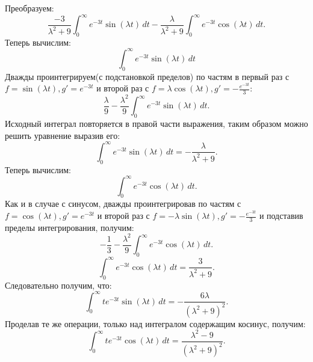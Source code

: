 \documentclass[11pt]{article}
\begin{document}
	\newline
	{\hspace{-0.6cm} Преобразуем:}
	\newline
	\[\frac{-3}{\lambda^2 + 9}\int_{0}^{\infty}e^{-3t}\sin(\lambda t)\,dt - \frac{\lambda}{\lambda^2 + 9}\int_{0}^{\infty}e^{-3t}\cos(\lambda t)\,dt.\]
	\newline
	{\hspace{-0.6cm} Теперь вычислим:}
	\[\int_{0}^{\infty}e^{-3t}\sin(\lambda t)\,dt\]
	\newline
	{\hspace{-0.6cm} Дважды проинтегрируем(с подстановкой пределов) по частям в первый раз с $f = \sin(\lambda t), g' = e^{-3t}$ и второй раз с $f = \lambda \cos(\lambda t), g' = -\frac{e^{-3t}}{3}$:}
	\newline
	\[ \frac{\lambda }{9} - \frac{\lambda^2}{9}\int_{0}^{\infty}e^{-3t}\sin(\lambda t)\,dt.\]
	\newpage
	{\vspace*{-2cm}\hspace{-0.6cm} Исходный интеграл повторяется в правой части выражения, таким образом можно решить уравнение выразив его: }
	\newline
	\[\int_{0}^{\infty}e^{-3t}\sin(\lambda t)\,dt = -\frac{\lambda}{\lambda^2 + 9}.\]
	\newline
	{\hspace{-0.6cm} Теперь вычислим:}
	\newline
	\[\int_{0}^{\infty}e^{-3t}\cos(\lambda t)\,dt.\]
	\newline
	{\hspace{-0.6cm} Как и в случае с синусом, дважды проинтегрировав по частям с $f = \cos(\lambda t), g' = e^{-3t}$ и второй раз с $f = -\lambda \sin(\lambda t), g' = -\frac{e^{-3t}}{3}$ и подставив пределы интегрирования, получим:}
	\newline
	\[-\frac{1}{3} - \frac{\lambda^2}{9}\int_{0}^{\infty}e^{-3t}\cos(\lambda t)\,dt.\]
	\[\int_{0}^{\infty}e^{-3t}\cos(\lambda t)\,dt = \frac{3}{\lambda^2 + 9}.\]
	\newline
	{\hspace{-0.6cm}Следовательно получим, что:}
	\newline
	\[\int_{0}^{\infty}te^{-3t}\sin(\lambda t)\,dt = -\frac{6\lambda}{(\lambda^2 + 9)^2} .\]
	\newline
	{\hspace{-0.6cm} Проделав те же операции, только над интегралом содержащим косинус, получим:}
	\newline
	\[\int_{0}^{\infty}te^{-3t}\cos(\lambda t)\,dt = \frac{\lambda^2 - 9}{(\lambda^2 + 9)^2}.\]
\end{document}
